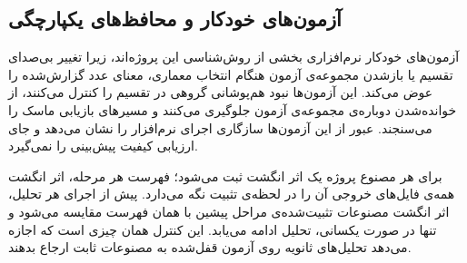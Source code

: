 \subsection{آزمون‌های خودکار و محافظ‌های یکپارچگی}

آزمون‌های خودکار نرم‌افزاری بخشی از روش‌شناسی این پروژه‌اند، زیرا تغییر بی‌صدای تقسیم یا بازشدن مجموعه‌ی آزمون هنگام انتخاب معماری، معنای عدد گزارش‌شده را عوض می‌کند. این آزمون‌ها نبود هم‌پوشانی گروهی در تقسیم را کنترل می‌کنند، از خوانده‌شدن دوباره‌ی مجموعه‌ی آزمون جلوگیری می‌کنند و مسیرهای بازیابی ماسک را می‌سنجند. عبور از این آزمون‌ها سازگاری اجرای نرم‌افزار را نشان می‌دهد و جای ارزیابی کیفیت پیش‌بینی را نمی‌گیرد.

برای هر مصنوع پروژه یک اثر انگشت  ثبت می‌شود؛ فهرست هر مرحله، اثر انگشت همه‌ی فایل‌های خروجی آن را در لحظه‌ی تثبیت نگه می‌دارد. پیش از اجرای هر تحلیل، اثر انگشت مصنوعات تثبیت‌شده‌ی مراحل پیشین با همان فهرست مقایسه می‌شود و تنها در صورت یکسانی، تحلیل ادامه می‌یابد. این کنترل همان چیزی است که اجازه می‌دهد تحلیل‌های ثانویه روی آزمون قفل‌شده به مصنوعات ثابت ارجاع بدهند.

